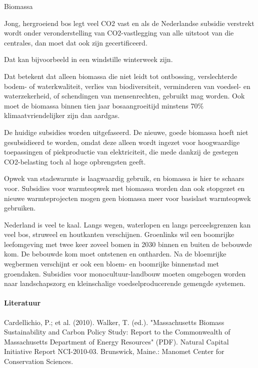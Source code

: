 \begin{voorstel}{Biomassa}
\begin{multicols*}{2}
\begin{aanbevelingen}
Jong, hergroeiend bos legt veel CO2 vast en als de Nederlandse subsidie verstrekt wordt onder veronderstelling van CO2-vastlegging van alle uitstoot van die centrales, dan moet dat ook zijn gecertificeerd. 

Dat kan bijvoorbeeld in een windstille winterweek zijn.

Dat betekent dat alleen biomassa die niet leidt tot ontbossing, verslechterde bodem- of waterkwaliteit, verlies van biodiversiteit, verminderen van voedsel- en waterzekerheid, of schendingen van mensenrechten, gebruikt mag worden. Ook moet de biomassa binnen tien jaar bosaangroeitijd minstens 70\% klimaatvriendelijker zijn dan aardgas.

De huidige subsidies worden uitgefaseerd. De nieuwe, goede biomassa hoeft niet gesubsidieerd te worden, omdat deze alleen wordt ingezet voor hoogwaardige toepassingen of piekproductie van elektriciteit, die mede dankzij de gestegen CO2-belasting toch al hoge opbrengsten geeft.

Opwek van stadswarmte is laagwaardig gebruik, en biomassa is hier te schaars voor. Subsidies voor warmteopwek met biomassa worden dan ook stopgezet en nieuwe warmteprojecten mogen geen biomassa meer voor basislast warmteopwek gebruiken.

Nederland is veel te kaal. Langs wegen, waterlopen en langs perceelsgrenzen kan veel bos, struweel en houtkanten verschijnen. Groenlinks wil een boomrijke leefomgeving met twee keer zoveel bomen in 2030 binnen en buiten de bebouwde kom. De bebouwde kom moet ontstenen en ontharden. Na de bloemrijke wegbermen verschijnt er ook een bloem- en boomrijke binnenstad met groendaken. Subsidies voor monocultuur-landbouw moeten omgebogen worden naar landschapszorg en kleinschalige voedselproducerende gemengde systemen.

\end{aanbevelingen}

\paragraph{Literatuur}
Cardellichio, P.; et al. (2010). Walker, T. (ed.). "Massachusetts Biomass Sustainability and Carbon Policy Study: Report to the Commonwealth of Massachusetts Department of Energy Resources" (PDF). Natural Capital Initiative Report NCI-2010-03. Brunswick, Maine.: Manomet Center for Conservation Sciences.


\end{multicols*}
\end{voorstel}
